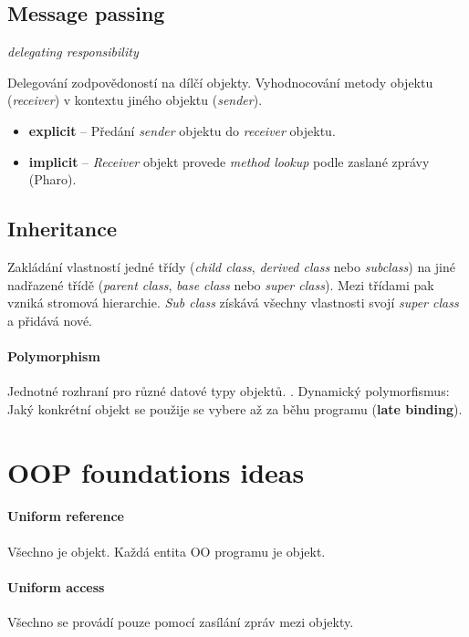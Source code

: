 \documentclass{szzclass}
\begin{document}
\subsection{Message passing}

\textit{delegating responsibility}


Delegování zodpovědoností na dílčí objekty.
Vyhodnocování metody objektu (\textit{receiver}) v kontextu jiného objektu (\textit{sender}).

\begin{itemize}
      \item \textbf{explicit} -- Předání \textit{sender} objektu do \textit{receiver} objektu.
      \item \textbf{implicit} -- \textit{Receiver} objekt provede \textit{method lookup} podle zaslané zprávy (Pharo).
\end{itemize}

\subsection{Inheritance}

Zakládání vlastností jedné třídy (\textit{child class}, \textit{derived class} nebo \textit{subclass}) na
jiné nadřazené třídě (\textit{parent class}, \textit{base class} nebo \textit{super class}).
Mezi třídami pak vzniká stromová hierarchie. \textit{Sub class} získává všechny vlastnosti svojí
\textit{super class} a přidává nové.

\paragraph{Polymorphism}
Jednotné rozhraní pro různé datové typy objektů. .
Dynamický polymorfismus: Jaký konkrétní objekt se použije se vybere až za běhu programu (\textbf{late binding}).


\section{OOP foundations ideas}

\paragraph{Uniform reference}
Všechno je objekt. Každá entita OO programu je objekt.

\paragraph{Uniform access}
Všechno se provádí pouze pomocí zasílání zpráv mezi objekty.
\end{document}
